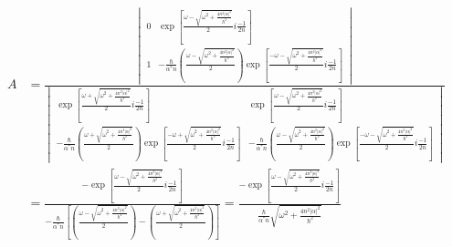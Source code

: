 \begin{align*}
    A & =
    \frac{\begin{vmatrix}
            0 &
            \exp\left[
                    \frac{\omega - \sqrt{\omega^2 + \frac{4n^2|\alpha|^2}{\hbar^2}}}{2} i\frac{-1}{2n}
                    \right] \\
            1 & -
            \frac{\hbar}{\alpha^* n }\left( \frac{\omega -\sqrt{\omega^2 + \frac{4n^2|\alpha|^2}{\hbar^2}}}{2}\right) \exp\left[
                                                                                                                              \frac{-\omega -\sqrt{\omega^2 + \frac{4n^2|\alpha|^2}{\hbar^2}}}{2}i\frac{-1}{2n}
                                                                                                                              \right]
        \end{vmatrix}}{\begin{vmatrix}
            \exp\left[
                    \frac{\omega + \sqrt{\omega^2 + \frac{4n^2|\alpha|^2}{\hbar^2}}}{2} i\frac{-1}{2n}
                    \right]                                    &
            \exp\left[
                    \frac{\omega - \sqrt{\omega^2 + \frac{4n^2|\alpha|^2}{\hbar^2}}}{2} i\frac{-1}{2n}
                    \right]                                                                                                             \\
            -\frac{\hbar}{\alpha^* n }\left(\frac{\omega + \sqrt{\omega^2 + \frac{4n^2|\alpha|^2}{\hbar^2}}}{2} \right)\exp\left[
                                                                                                                               \frac{-\omega + \sqrt{\omega^2 + \frac{4n^2|\alpha|^2}{\hbar^2}}}{2} i\frac{-1}{2n}
                                                                                                                               \right] & -
            \frac{\hbar}{\alpha^* n }\left( \frac{\omega -\sqrt{\omega^2 + \frac{4n^2|\alpha|^2}{\hbar^2}}}{2}\right) \exp\left[
                                                                                                                              \frac{-\omega -\sqrt{\omega^2 + \frac{4n^2|\alpha|^2}{\hbar^2}}}{2}i\frac{-1}{2n}
                                                                                                                              \right]
        \end{vmatrix}} \\
      & =
    \frac{-\exp\left[
            \frac{\omega - \sqrt{\omega^2 + \frac{4n^2|\alpha|^2}{\hbar^2}}}{2} i\frac{-1}{2n}
            \right]}
    {-\frac{\hbar}{\alpha^* n}
        \left[
            \left( \frac{\omega -\sqrt{\omega^2 + \frac{4n^2|\alpha|^2}{\hbar^2}}}{2}\right)
            -
            \left( \frac{\omega +\sqrt{\omega^2 + \frac{4n^2|\alpha|^2}{\hbar^2}}}{2}\right)
            \right]}
    =
    \frac{-\exp\left[
            \frac{\omega - \sqrt{\omega^2 + \frac{4n^2|\alpha|^2}{\hbar^2}}}{2} i\frac{-1}{2n}
            \right]}
    {\frac{\hbar}{\alpha^* n}
        \sqrt{\omega^2 + \frac{4n^2|\alpha|^2}{\hbar^2}}}
\end{align*}
